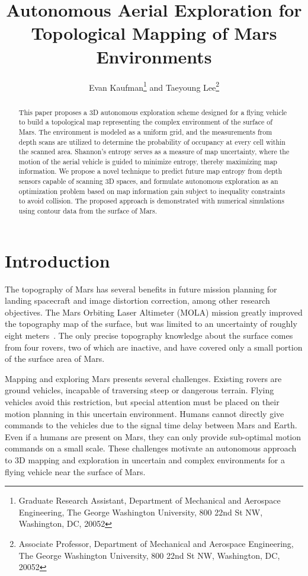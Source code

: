 \documentclass[conf]{new-aiaa}
\title{Autonomous Aerial Exploration for Topological Mapping of Mars Environments}
\author{Evan Kaufman\footnote{Graduate Research Assistant, Department of Mechanical and Aerospace Engineering, The George Washington University, 800 22nd St NW, Washington, DC, 20052} and Taeyoung Lee\footnote{Associate Professor, Department of Mechanical and Aerospace Engineering, The George Washington University, 800 22nd St NW, Washington, DC, 20052}}%
\affil{The George Washington University, Washington, DC, 20052}
\begin{document}
\maketitle

\begin{abstract}
This paper proposes a 3D autonomous exploration scheme designed for a flying vehicle to build a topological map representing the complex environment of the surface of Mars. 
The environment is modeled as a uniform grid, and the measurements from depth scans are utilized to determine the probability of occupancy at every cell within the scanned area. 
Shannon's entropy serves as a measure of map uncertainty, where the motion of the aerial vehicle is guided to minimize entropy, thereby maximizing map information. We propose a novel technique to predict future map entropy from depth sensors capable of scanning 3D spaces, and formulate autonomous exploration as an optimization problem based on map information gain subject to inequality constraints to avoid collision. The proposed approach is demonstrated with numerical simulations using contour data from the surface of Mars.
\end{abstract}


\section{Introduction}

The topography of Mars has several benefits in future mission planning for landing spacecraft and  image distortion correction, among other research objectives. The Mars Orbiting Laser Altimeter (MOLA) mission greatly improved the topography map of the surface, but was limited to an uncertainty of roughly eight meters~\cite{MOLA99}. The only precise topography knowledge about the surface comes from four rovers, two of which are inactive, and have covered only a small portion of the surface area of Mars.

Mapping and exploring Mars presents several challenges. Existing rovers are ground vehicles, incapable of traversing steep or dangerous terrain. Flying vehicles avoid this restriction, but special attention must be placed on their motion planning in this uncertain environment. Humans cannot directly give commands to the vehicles due to the signal time delay between Mars and Earth. Even if a humans are present on Mars, they can only provide sub-optimal motion commands on a small scale. These challenges motivate an autonomous approach to 3D mapping and exploration in uncertain and complex environments for a flying vehicle near the surface of Mars.
\end{document}

